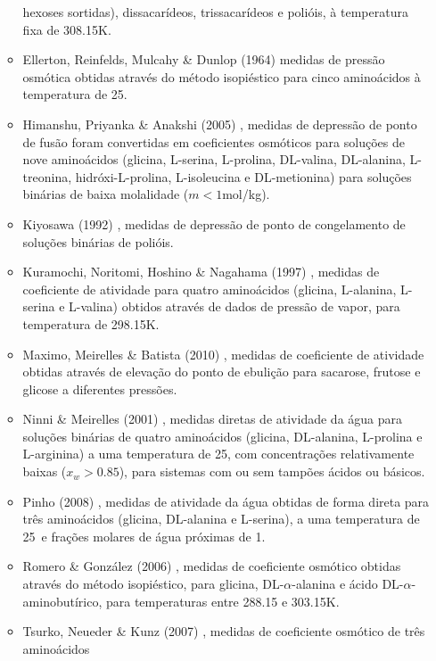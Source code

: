 \documentclass[
	12pt,				%
	openright,
	twoside,
	a4paper,			%
	english,			%
	french,				%
	spanish,			%
	brazil				%
	]{abntex2}
\begin{document}
\begin{itemize}
\begin{itemize}
				hexoses sortidas), dissacarídeos, trissacarídeos
				e polióis, à temperatura fixa de 308.15K.
			\item Ellerton, Reinfelds, Mulcahy \& Dunlop (1964)
				\cite{ellerton1964} medidas de pressão osmótica
				obtidas através do método isopiéstico para cinco
				aminoácidos à temperatura de 25\textcelsius.
			\item Himanshu, Priyanka \& Anakshi (2005)
				\cite{himanshu2005}, medidas de depressão de
				ponto de fusão foram convertidas em coeficientes
				osmóticos para soluções de nove aminoácidos
				(glicina, L-serina, L-prolina, DL-valina,
				DL-alanina, L-treonina, hidróxi-L-prolina,
				L-isoleucina e DL-metionina) para soluções binárias
				de baixa molalidade ($m < 1$mol/kg).
			\item Kiyosawa (1992) \cite{kiyosawa1992}, medidas de
				depressão de ponto de congelamento de soluções
				binárias de polióis.
			\item Kuramochi, Noritomi, Hoshino \& Nagahama (1997)
				\cite{kuramochi1997}, medidas de coeficiente de
				atividade para quatro aminoácidos (glicina,
				L-alanina, L-serina e L-valina) obtidos através
				de dados de pressão de vapor, para temperatura
				de 298.15K.
			\item Maximo, Meirelles \& Batista (2010) \cite{maximo2010},
				medidas de coeficiente de atividade obtidas através
				de elevação do ponto de ebulição para sacarose,
				frutose e glicose a diferentes pressões.
			\item Ninni \& Meirelles (2001) \cite{ninni2001}, medidas
				diretas de atividade da água para soluções binárias
				de quatro aminoácidos (glicina, DL-alanina, L-prolina
				e L-arginina) a uma temperatura de 25\textcelsius,
				com concentrações relativamente baixas
				($x_w > 0.85$), para sistemas com ou sem tampões
				ácidos ou básicos.
			\item Pinho (2008) \cite{pinho2008}, medidas de atividade da
				água obtidas de forma direta para três aminoácidos
				(glicina, DL-alanina e L-serina), a uma temperatura
				de 25\textcelsius\ e frações molares de água
				próximas de 1.
			\item Romero \& González (2006) \cite{romero2006}, medidas
				de coeficiente osmótico obtidas através do método
				isopiéstico, para glicina, DL-$\alpha$-alanina e
				ácido DL-$\alpha$-aminobutírico, para temperaturas
				entre 288.15 e 303.15K.
			\item Tsurko, Neueder \& Kunz (2007) \cite{tsurko2007},
				medidas de coeficiente osmótico de três aminoácidos

\end{itemize}
\end{itemize}
\end{document}
